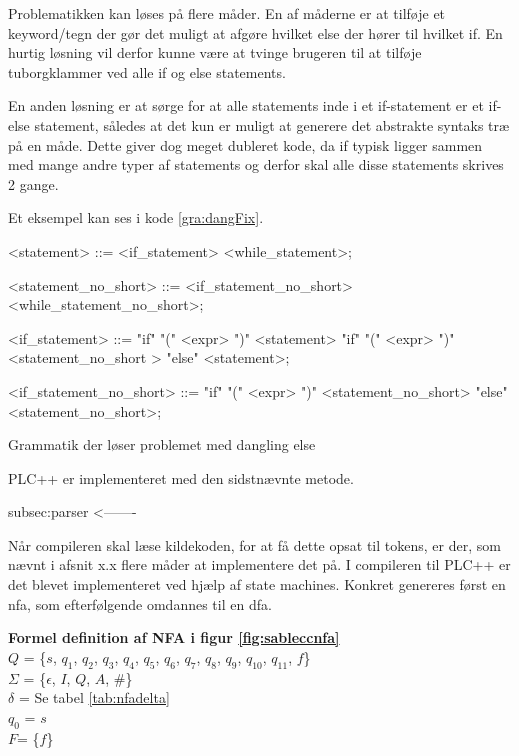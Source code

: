 Problematikken kan løses på flere måder. En af måderne er at tilføje et keyword/tegn der gør det muligt at afgøre hvilket else der hører til hvilket if. En hurtig løsning vil derfor kunne være at tvinge brugeren til at tilføje tuborgklammer ved alle if og else statements.

En anden løsning er at sørge for at alle statements inde i et if-statement er et if-else statement, således at det kun er muligt at generere det abstrakte syntaks træ på en måde. Dette giver dog meget dubleret kode, da if typisk ligger sammen med mange andre typer af statements og derfor skal alle disse statements skrives 2 gange.

Et eksempel kan ses i kode \ref{gra:dangFix}.

\begin{Grammar}
 \begin{grammar}
    <statement> ::= <if\_statement>
    \alt <while\_statement>;
    
    <statement\_no\_short> ::= <if\_statement\_no\_short>
    \alt <while\_statement\_no\_short>;
    
    <if\_statement> ::= "if" "(" <expr> ")" <statement> 
    \alt"if" "(" <expr> ")" <statement\_no\_short > "else" <statement>;
    
    <if\_statement\_no\_short> ::= "if" "(" <expr> ")" <statement\_no\_short> "else" <statement\_no\_short>;
 \end{grammar}
 \caption{Grammatik der løser problemet med dangling else}\label{gra:dangFix}
\end{Grammar}

PLC++ er implementeret med den sidstnævnte metode.

subsec:parser <-------
 

\noindent Når compileren skal læse kildekoden, for at få dette opsat til tokens, er der, som nævnt i afsnit x.x flere måder at implementere det på. I compileren til PLC++ er det blevet implementeret ved hjælp af state machines. Konkret genereres først en \gls{nfa}, som efterfølgende omdannes til en \gls{dfa}.


\noindent \textbf{Formel definition af NFA i figur \ref{fig:sableccnfa}}\\
\noindent $Q$ = \{$s$, $q_1$, $q_2$, $q_3$, $q_4$, $q_5$, $q_6$, $q_7$, $q_8$, $q_9$, $q_{10}$, $q_{11}$, $f$\}\\
\noindent $\Sigma$ = \{$\epsilon$, $I$, $Q$, $A$, $\#$\}\\
\noindent $\delta$ = Se tabel \ref{tab:nfadelta}\\
\noindent $q_0$ = $s$\\
\noindent $F$= \{$f$\}\\


